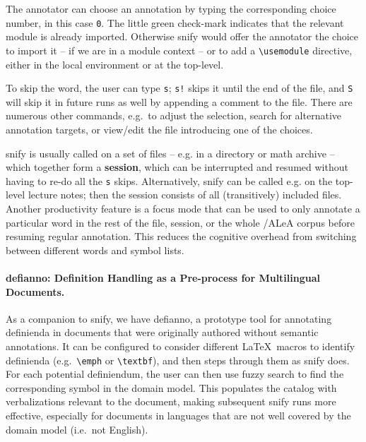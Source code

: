 \documentclass[runningheads]{llncs}
\newcommand\ALeA{\textsf{ALeA}\xspace}
\newcommand\snify{\textsf{snify}\xspace}
\newcommand\defianno{\textsf{defianno}\xspace}
\begin{document}
The annotator can choose an annotation by typing the corresponding choice number,
in this case \lstinline|0|.
The little green check-mark indicates that the relevant module is already imported.
Otherwise \snify would offer the annotator the choice to import it -- if we are
in a module context -- or to add a \lstinline|\usemodule| directive, either in the
local environment or at the top-level.

To skip the word, the user can type \lstinline|s|;
\lstinline|s!| skips it until the end of the file, and \lstinline|S|
will skip it in future runs as well by appending a comment to the file.
There are numerous other commands, e.g.\ to adjust the selection,
search for alternative annotation targets,
or view/edit the file introducing one of the choices.

\snify is usually called on a set of files -- e.g. in a directory or math archive -- which
together form a \textbf{session}, which can be interrupted and resumed without having to
re-do all the \lstinline|s| skips. Alternatively, \snify can be called e.g. on the
top-level lecture notes; then the session consists of all (transitively) included
files. Another productivity feature is a focus mode that can be used to only annotate
a particular word in the rest of the file, session, or the whole \sTeX/\ALeA corpus before
resuming regular annotation. This reduces the cognitive overhead from switching between
different words and symbol lists.

\paragraph{\defianno: Definition Handling as a Pre-process for Multilingual Documents.}
As a companion to \snify, we have \defianno, a prototype tool for annotating definienda in
documents that were originally authored without semantic annotations.  It can be
configured to consider different \LaTeX\ macros to identify definienda (e.g.\
\lstinline[language={}]|\emph| or \lstinline[language={}]|\textbf|), and then steps
through them as \snify does.  For each potential definiendum, the user can then use fuzzy
search to find the corresponding symbol in the domain model.  This populates the catalog
with verbalizations relevant to the document, making subsequent \snify runs more
effective, especially for documents in languages that are not well covered by the domain
model (i.e.\ not English).
\end{document}
